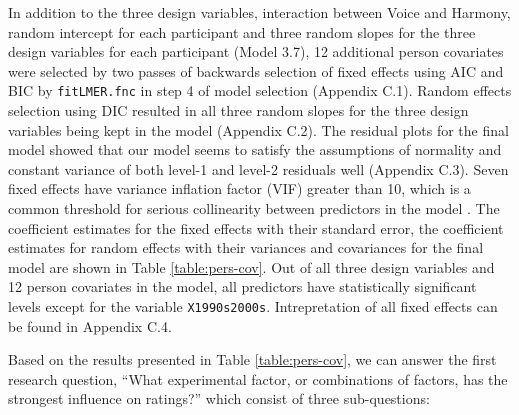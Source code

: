 \documentclass{article}
\begin{document}
\newpage
\doublespacing
In addition to the three design variables, interaction between Voice and Harmony, random intercept for each participant and three random slopes for the three design variables for each participant (Model 3.7), 12 additional person covariates were selected by two passes of backwards selection of fixed effects using AIC and BIC by \texttt{fitLMER.fnc} in step 4 of model selection (Appendix C.1). Random effects selection using DIC resulted in all three random slopes for the three design variables being kept in the model (Appendix C.2). The residual plots for the final model showed that our model seems to satisfy the assumptions of normality and constant variance of both level-1 and level-2 residuals well (Appendix C.3). Seven fixed effects have variance inflation factor (VIF) greater than 10, which is a common threshold for serious collinearity between predictors in the model \parencite[]{lecture-07}. The coefficient estimates for the fixed effects with their standard error, the coefficient estimates for random effects with their variances and covariances for the final model are shown in Table \ref{table:pers-cov}. Out of all three design variables and 12 person covariates in the model, all predictors have statistically significant levels except for the variable \texttt{X1990s2000s}. Intrepretation of all fixed effects can be found in Appendix C.4.
\bigbreak

Based on the results presented in Table \ref{table:pers-cov}, we can answer the first research question, ``What experimental factor, or combinations of factors, has the strongest influence on ratings?'' which consist of three sub-questions:
\end{document}
